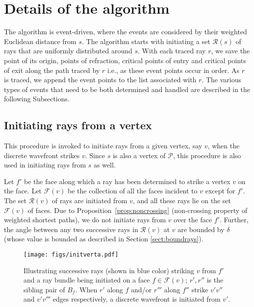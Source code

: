 \documentclass[11pt]{article}
\def\calP{\mathcal{P}}
\def\calR{\mathcal{R}}
\def\calF{\mathcal{F}}
\begin{document}
\section{Details of the algorithm}
\label{sect:algodetails}

The algorithm is event-driven, where the events are considered by their weighted Euclidean distance from $s$.
The algorithm starts with initiating a set $\calR(s)$ of rays that are uniformly distributed around $s$.
With each traced ray $r$, we save the point of its origin, points of refraction, critical points of entry and critical points of exit along the path traced by $r$  i.e., as these event points occur in order.
As $r$ is traced, we append the event points to the list associated with $r$.
The various types of events that need to be both determined and handled are described in the following Subsections.

\subsection{Initiating rays from a vertex}
\label{subsect:initraysvert}

This procedure is invoked to initiate rays from a given vertex, say $v$, when the discrete wavefront strikes $v$.
Since $s$ is also a vertex of $\calP$, this procedure is also used in initiating rays from $s$ as well. 

Let $f'$ be the face along which a ray has been determined to strike a vertex $v$ on the face.
Let $\calF(v)$ be the collection of all the faces incident to $v$ except for $f'$.
The set $\calR(v)$ of rays are initiated from $v$, and all these rays lie on the set $\calF(v)$ of faces.
Due to Proposition~\ref{prop:noncrossing} (non-crossing property of weighted shortest paths), we do not initiate rays from $v$ over the face $f'$. 
Further, the angle between any two successive rays in $\calR(v)$ at $v$  are bounded by $\delta$ (whose value is bounded as described in Section \ref{sect:boundrays}).

\begin{wrapfigure}{r}{0.5\textwidth}
\begin{minipage}[t]{\linewidth}
\begin{center}
\texttt{[image: figs/initverta.pdf]}
\caption{\footnotesize Illustrating successive rays (shown in blue color) striking $v$ from $f'$ and a ray bundle being initiated on a face $f \in \calF(v)$; $r', r''$ is the sibling pair of $B_f$.  When $r'$ along $f$ and/or $r'''$ along $f''$ strike $v'v''$ and $v'v'''$ edges respectively, a discrete wavefront is initiated from $v'$.}
\label{fig:initverta}
\end{center}
\end{minipage}
\end{wrapfigure}
\end{document}
